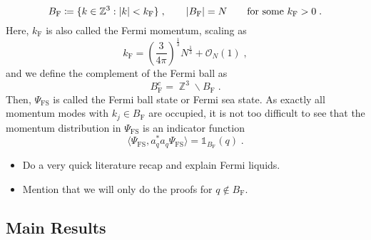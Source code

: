 \documentclass[12pt,a4paper]{article}
\numberwithin{equation}{section}
\newcommand{\ZZZ}{\mathbb{Z}}
\newcommand{\1}{\mathbb{I}}
\newcommand{\F}{\mathrm{F}}
\newcommand{\FS}{\mathrm{FS}}
\DeclareMathOperator{\Z}{\mathbb{Z}}
\theoremstyle{plain}
\theoremstyle{definition}
\theoremstyle{remark}
\theoremstyle{plain}
\theoremstyle{definition}
\theoremstyle{remark}
\begin{document}
\begin{equation}
	B_{\F} \coloneq \{ k \in \ZZZ^3 : |k| < k_{\F} \} \;, \qquad
	|B_{\F}| = N \qquad \textnormal{for some } k_{\F} > 0 \;.
\end{equation}
Here, $ k_{\F} $ is also called the Fermi momentum, scaling as~\cite[(3.2)]{BNPSS20}
\begin{equation}
	k_{\F} = \left(\frac{3}{4\pi}\right)^\frac{1}{3}N^\frac{1}{3} + \mathcal{O}_N(1) \;,
\end{equation}
and we define the complement of the Fermi ball as 
\begin{equation}
	B_{\F}^c=\Z^3\backslash B_{\F} \;.
\end{equation}
Then, $ \Psi_{\FS} $ is called the Fermi ball state or Fermi sea state. As exactly all momentum modes with $ k_j \in B_{\F} $ are occupied, it is not too difficult to see that the momentum distribution in $ \Psi_{\FS} $ is an indicator function
\begin{equation}
	\langle \Psi_{\FS}, a_q^* a_q \Psi_{\FS} \rangle
	= \mathds{1}_{B_{\F}}(q) \;.
\end{equation}


\begin{itemize}
\item Do a very quick literature recap and explain Fermi liquids.
\item Mention that we will only do the proofs for $ q \notin B_{\F} $.
\end{itemize}




\subsection{Main Results}
\label{subsec:mainresult}
\end{document}
